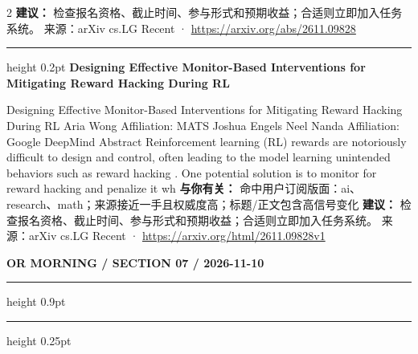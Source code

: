 \documentclass[10.5pt]{ctexart}
\begin{document}
\begin{multicols}{2}
\textbf{建议：} 检查报名资格、截止时间、参与形式和预期收益；合适则立即加入任务系统。
{\footnotesize\color{ormuted} 来源：arXiv cs.LG Recent · \url{https://arxiv.org/abs/2611.09828}}
\vspace{2mm}
\hrule height 0.2pt
\vspace{2mm}
{\large\bfseries Designing Effective Monitor-Based Interventions for Mitigating Reward Hacking During RL}\par
Designing Effective Monitor-Based Interventions for Mitigating Reward Hacking During RL Aria Wong Affiliation: MATS Joshua Engels Neel Nanda Affiliation: Google DeepMind Abstract Reinforcement learning (RL) rewards are notoriously difficult to design and control, often leading to the model learning unintended behaviors such as reward hacking . One potential solution is to monitor for reward hacking and penalize it wh
\textbf{与你有关：} 命中用户订阅版面：ai、research、math；来源接近一手且权威度高；标题/正文包含高信号变化
\textbf{建议：} 检查报名资格、截止时间、参与形式和预期收益；合适则立即加入任务系统。
{\footnotesize\color{ormuted} 来源：arXiv cs.LG Recent · \url{https://arxiv.org/html/2611.09828v1}}
\end{multicols}
\newpage
{\small\bfseries OR MORNING / SECTION 07 / 2026-11-10}
\vspace{2mm}
\hrule height 0.9pt
\vspace{1.5mm}
\hrule height 0.25pt
\vspace{4mm}
\end{document}
